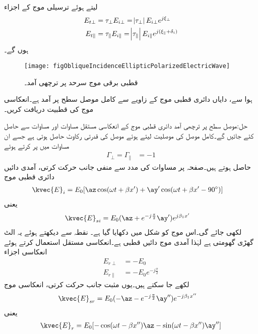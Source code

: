 لیتے ہوئے ترسیلی موج کے  اجزاء
\begin{align}
E_{t\perp}&=\tau_{\perp} E_{i\perp}=\abs{\tau_{\perp}} E_{i\perp}e^{j\xi_{\perp}}\\
E_{t\parallel}&=\tau_{\parallel} E_{i\parallel}=\abs{\tau_{\parallel}} E_{i\parallel}e^{j(\xi_{\parallel}+\delta_i)}
\end{align}
ہوں گے۔
\begin{figure}
\centering
\texttt{[image: figObliqueIncidenceEllipticPolarizedElectricWave]}
\caption{قطبی برقی موج سرحد پر ترچھی آمد۔}
\label{شکل_قطبی_بیضوی_قطبی_ترچھی_آمد}
\end{figure}
ہوا سے،  دایاں دائری قطبی موج  کے زاویے سے  کامل موصل سطح پر آمد ہے۔انعکاسی موج کی قطبیت دریافت کریں۔

حل:موصل سطح پر ترچھی آمد دائری قطبی موج کے  انعکاسی مستقل مساوات  اور مساوات  سے  حاصل کئے جائیں گے۔کامل موصل کی موصلیت  لیتے ہوئے  موصل کی قدرتی رکاوٹ  حاصل ہوتی ہے جسے ان مساوات میں پر کرتے ہوئے
\begin{align*}
\Gamma_{\perp}=\Gamma_{\parallel}&=-1
\end{align*}
حاصل ہوتے ہیں۔صفحہ  پر مساوات  کی مدد سے منفی  جانب حرکت کرتی، آمدی دائیں دائری قطبی موج
\begin{align*}
\kvec{E}_i&=E_0[\az\cos(\omega t +\beta x')+\ay' \cos(\omega t +\beta x' -90^{\circ})]
\end{align*}
یعنی
\begin{align*}
\kvec{E}_{si}&=E_0(\az+e^{-j\frac{\pi}{2}} \ay')e^{j\beta_1 x'}
\end{align*}
لکھی جائے گی۔اس موج کو شکل  میں دکھایا گیا ہے۔ نقطہ  سے دیکھتے ہوئے یہ الٹ گھڑی گھومتی ہے لہٰذا آمدی موج دائیں قطبی ہے۔انعکاسی مستقل استعمال کرتے ہوئے انعکاسی اجزاء 
\begin{align*}
E_{r\perp}&=-E_0\\
E_{r\parallel}&=- E_0 e^{-j\frac{\pi}{2}}
\end{align*}
لکھے جا سکتے ہیں۔یوں مثبت  جانب حرکت کرتی، انعکاسی موج
\begin{align*}
\kvec{E}_{sr}&=E_0(- \az- e^{-j\frac{\pi}{2}}\ay'')e^{-j\beta_1 x''}
\end{align*}
یعنی
\begin{align*}
\kvec{E}_r=E_0[-\cos (\omega t -\beta x'') \az -\sin(\omega t -\beta x'')\ay'']
\end{align*}
